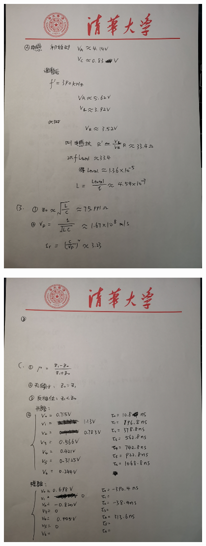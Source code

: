 \documentclass[UTF8]{ctexart}
\begin{document}
\begin{figure}[H]
\centering
\includegraphics[width=0.95\textwidth]{A2.jpg}
\end{figure}
\begin{figure}[H]
\centering
\includegraphics[width=0.95\textwidth]{A3.jpg}
\end{figure}
\end{document}

